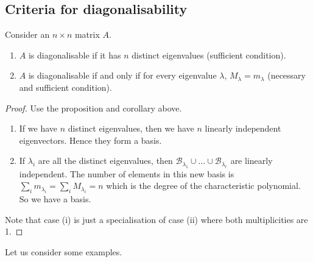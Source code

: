 \subsection{Criteria for diagonalisability}
\begin{proposition}
	Consider an \(n \times n\) matrix \(A\).
	\begin{enumerate}
		\item \(A\) is diagonalisable if it has \(n\) distinct eigenvalues (sufficient condition).
		\item \(A\) is diagonalisable if and only if for every eigenvalue \(\lambda\), \(M_\lambda = m_\lambda\) (necessary and sufficient condition).
	\end{enumerate}
\end{proposition}
\begin{proof}
	Use the proposition and corollary above.
	\begin{enumerate}
		\item If we have \(n\) distinct eigenvalues, then we have \(n\) linearly independent eigenvectors.
		      Hence they form a basis.
		\item If \(\lambda_i\) are all the distinct eigenvalues, then \(\mathcal B_{\lambda_1} \cup \dots \cup \mathcal B_{\lambda_r}\) are linearly independent.
		      The number of elements in this new basis is \(\sum_{i} m_{\lambda_i} = \sum_{i} M_{\lambda_i} = n\) which is the degree of the characteristic polynomial.
		      So we have a basis.
	\end{enumerate}
	Note that case (i) is just a specialisation of case (ii) where both multiplicities are 1.
\end{proof}
Let us consider some examples.
